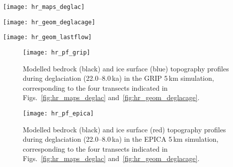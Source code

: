 \documentclass[tc, manuscript]{copernicus}
\begin{document}
\begin{figure*}%
\texttt{[image: hr\_maps\_deglac]}
\caption{%
      Snapshots of modelled surface topography (200\,\unit{m} contours) and
      surface velocity (colour mapping) during the last deglaciation from
      the GRIP (top panels) and EPICA (bottom panels) 5\,\unit{km}
      simulations. Dashed segments \textbf{(A--D)} indicate the location of
      profiles used in Figs.~\ref{fig:hr_pf_grip}
      and~\ref{fig:hr_pf_epica}.}
\label{fig:hr_maps_deglac}%
\end{figure*}%


\begin{figure*}%
\texttt{[image: hr\_geom\_deglacage]}
\caption{%
      Modelled age of the last deglaciation. Areas that have been covered
      only before the last glacial maximum are marked in green. Hatches
      denote re-advance of mountain-centred ice caps and the decaying ice
      sheet between 14 and 10\,\unit{ka}. Dashed segments \textbf{(A--D)}
      indicate the location of profiles used in Figs.~\ref{fig:hr_pf_grip}
      and~\ref{fig:hr_pf_epica}.}
\label{fig:hr_geom_deglacage}%
\end{figure*}%


\begin{figure*}%
\texttt{[image: hr\_geom\_lastflow]}
\caption{%
      Modelled deglacial basal ice velocities. Hatches indicate areas that
      remain non-sliding throughout deglaciation (22.0--8.0\,\unit{ka}),
      notably including parts of the Interior Plateau (IP). Note the
      concentric patterns of deglacial flow in the Liard Lowland (LL).
      Sliding grid cells were distinguished from non-sliding grid cells
      using a~basal velocity threshold of 1\,\unit{m\,yr^{-1}}.}
\label{fig:hr_geom_lastflow}%
\end{figure*}%


\begin{figure}%
\texttt{[image: hr\_pf\_grip]}
\caption{%
      Modelled bedrock (black) and ice surface (blue) topography profiles
      during deglaciation (22.0--8.0\,\unit{ka}) in the GRIP 5\,\unit{km}
      simulation, corresponding to the four transects indicated in
      Figs.~\ref{fig:hr_maps_deglac}
      and~\ref{fig:hr_geom_deglacage}.}
\label{fig:hr_pf_grip}%
\end{figure}%


\begin{figure}%
\texttt{[image: hr\_pf\_epica]}
\caption{%
      Modelled bedrock (black) and ice surface (red) topography profiles
      during deglaciation (22.0--8.0\,\unit{ka}) in the EPICA 5\,\unit{km}
      simulation, corresponding to the four transects indicated in
      Figs.~\ref{fig:hr_maps_deglac}
      and~\ref{fig:hr_geom_deglacage}.}
\label{fig:hr_pf_epica}%
\end{figure}
\end{document}
